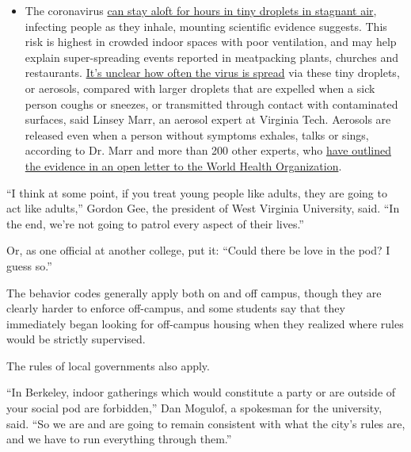 \begin{itemize}
  \begin{itemize}
  \tightlist
  \item
    The coronavirus
    \href{https://www.nytimes3xbfgragh.onion/2020/07/04/health/239-experts-with-one-big-claim-the-coronavirus-is-airborne.html?action=click\&pgtype=Article\&state=default\&region=MAIN_CONTENT_3\&context=storylines_faq}{can
    stay aloft for hours in tiny droplets in stagnant air}, infecting
    people as they inhale, mounting scientific evidence suggests. This
    risk is highest in crowded indoor spaces with poor ventilation, and
    may help explain super-spreading events reported in meatpacking
    plants, churches and restaurants.
    \href{https://www.nytimes3xbfgragh.onion/2020/07/06/health/coronavirus-airborne-aerosols.html?action=click\&pgtype=Article\&state=default\&region=MAIN_CONTENT_3\&context=storylines_faq}{It's
    unclear how often the virus is spread} via these tiny droplets, or
    aerosols, compared with larger droplets that are expelled when a
    sick person coughs or sneezes, or transmitted through contact with
    contaminated surfaces, said Linsey Marr, an aerosol expert at
    Virginia Tech. Aerosols are released even when a person without
    symptoms exhales, talks or sings, according to Dr. Marr and more
    than 200 other experts, who
    \href{https://academic.oup.com/cid/article/doi/10.1093/cid/ciaa939/5867798}{have
    outlined the evidence in an open letter to the World Health
    Organization}.
  \end{itemize}
\end{itemize}

``I think at some point, if you treat young people like adults, they are
going to act like adults,'' Gordon Gee, the president of West Virginia
University, said. ``In the end, we're not going to patrol every aspect
of their lives.''

Or, as one official at another college, put it: ``Could there be love in
the pod? I guess so.''

The behavior codes generally apply both on and off campus, though they
are clearly harder to enforce off-campus, and some students say that
they immediately began looking for off-campus housing when they realized
where rules would be strictly supervised.

The rules of local governments also apply.

``In Berkeley, indoor gatherings which would constitute a party or are
outside of your social pod are forbidden,'' Dan Mogulof, a spokesman for
the university, said. ``So we are and are going to remain consistent
with what the city's rules are, and we have to run everything through
them.''

